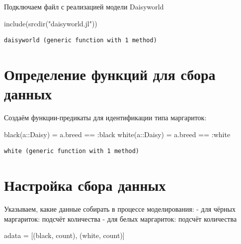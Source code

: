 \documentclass[
  12pt,
  a4paper,
  DIV=11,
  numbers=noendperiod]{scrreprt}
\newenvironment{Shaded}{\begin{snugshade}}{\end{snugshade}}
\newcommand{\DataTypeTok}[1]{\textcolor[rgb]{0.68,0.00,0.00}{#1}}
\newcommand{\FunctionTok}[1]{\textcolor[rgb]{0.28,0.35,0.67}{#1}}
\newcommand{\NormalTok}[1]{\textcolor[rgb]{0.00,0.23,0.31}{#1}}
\newcommand{\OperatorTok}[1]{\textcolor[rgb]{0.37,0.37,0.37}{#1}}
\newcommand{\StringTok}[1]{\textcolor[rgb]{0.13,0.47,0.30}{#1}}
\begin{document}
Подключаем файл с реализацией модели Daisyworld

\begin{Shaded}
\begin{Highlighting}[]
\FunctionTok{include}\NormalTok{(}\FunctionTok{srcdir}\NormalTok{(}\StringTok{"daisyworld.jl"}\NormalTok{))}
\end{Highlighting}
\end{Shaded}

\begin{verbatim}
daisyworld (generic function with 1 method)
\end{verbatim}

\section{Определение функций для сбора
данных}\label{ux43eux43fux440ux435ux434ux435ux43bux435ux43dux438ux435-ux444ux443ux43dux43aux446ux438ux439-ux434ux43bux44f-ux441ux431ux43eux440ux430-ux434ux430ux43dux43dux44bux445-2}

Создаём функции-предикаты для идентификации типа маргариток:

\begin{Shaded}
\begin{Highlighting}[]
\FunctionTok{black}\NormalTok{(a}\OperatorTok{::}\DataTypeTok{Daisy}\NormalTok{) }\OperatorTok{=}\NormalTok{ a.breed }\OperatorTok{==} \OperatorTok{:}\NormalTok{black}
\FunctionTok{white}\NormalTok{(a}\OperatorTok{::}\DataTypeTok{Daisy}\NormalTok{) }\OperatorTok{=}\NormalTok{ a.breed }\OperatorTok{==} \OperatorTok{:}\NormalTok{white}
\end{Highlighting}
\end{Shaded}

\begin{verbatim}
white (generic function with 1 method)
\end{verbatim}

\section{Настройка сбора
данных}\label{ux43dux430ux441ux442ux440ux43eux439ux43aux430-ux441ux431ux43eux440ux430-ux434ux430ux43dux43dux44bux445-2}

Указываем, какие данные собирать в процессе моделирования: - для чёрных
маргариток: подсчёт количества - для белых маргариток: подсчёт
количества

\begin{Shaded}
\begin{Highlighting}[]
\NormalTok{adata }\OperatorTok{=}\NormalTok{ [(black, count), (white, count)]}
\end{Highlighting}
\end{Shaded}
\end{document}
